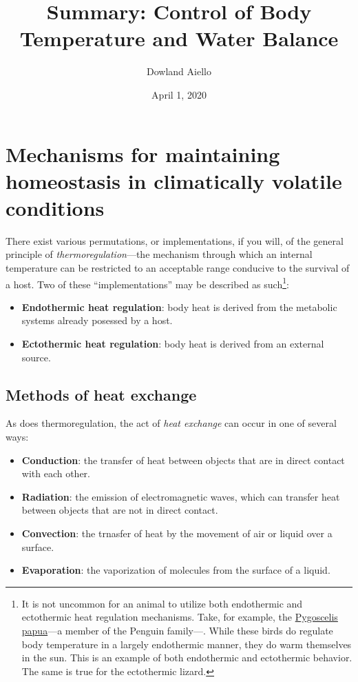 \documentclass{article}
\begin{document}
\title{Summary: Control of Body Temperature and Water Balance}
\author{Dowland Aiello}
\date{April 1, 2020}

\maketitle
\tableofcontents
\fancyhf{}

\newpage

\section{Mechanisms for maintaining homeostasis in climatically volatile conditions}

There exist various permutations, or implementations, if you will, of the
general principle of \emph{thermoregulation}---the mechanism through which an
internal temperature can be restricted to an acceptable range conducive to the
survival of a host. Two of these ``implementations'' may be described as
such\footnote{It is not uncommon for an animal to utilize both endothermic and
ectothermic heat regulation mechanisms. Take, for example, the
\href{https://en.wikipedia.org/wiki/Gentoo_penguin}{Pygoscelis papua}---a
member of the Penguin family---. While these birds do regulate body temperature
in a largely endothermic manner, they do warm themselves in the sun. This is an
example of both endothermic and ectothermic behavior. The same is true for the
ectothermic lizard.}:

\begin{itemize}
	\item \textbf{Endothermic heat regulation}: body heat is derived from the metabolic systems already posessed by a host.
	\item \textbf{Ectothermic heat regulation}: body heat is derived from an external source.
\end{itemize}

\subsection{Methods of heat exchange}

As does thermoregulation, the act of \emph{heat exchange} can occur in one of
several ways:

\begin{itemize}
	\item \textbf{Conduction}: the transfer of heat between objects that are in
		direct contact with each other.
	\item \textbf{Radiation}: the emission of electromagnetic waves, which can
		transfer heat between objects that are not in direct contact.
	\item \textbf{Convection}: the trnasfer of heat by the movement of air or
		liquid over a surface.
	\item \textbf{Evaporation}: the vaporization of molecules from the surface of a liquid.
\end{itemize}
\end{document}
